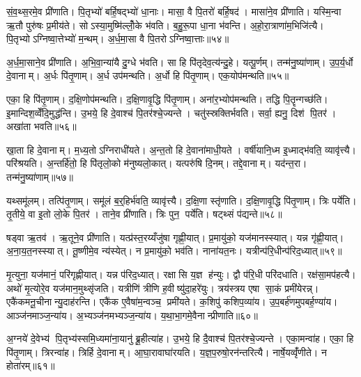 सं॒व॒थ्स॒रमे॒व प्री॑णाति। पि॒तृभ्यो॑ बर्\mbox{}हि॒षद्भ्यो॑ धा॒नाः। मासा॒ वै पि॒तरो॑ बर्\mbox{}हि॒षद॑। मासा॑ने॒व प्री॑णाति। यस्मि॒न्वा ऋ॒तौ पुरु॑षः प्र॒मीय॑ते। सोऽस्या॒मुष्मि॑ल्लोँ॒के भ॑वति। ब॒हु॒रू॒पा धा॒ना भ॑वन्ति। अ॒हो॒रा॒त्राणा॑म॒भिजि॑त्यै। पि॒तृभ्योऽग्निष्वा॒त्तेभ्यो॑ म॒न्थम्। अ॒र्ध॒मा॒सा वै पि॒तरोऽग्निष्वा॒त्ताः॥५४॥

अ॒र्ध॒मा॒साने॒व प्री॑णाति। अ॒भि॒वा॒न्या॑यै दु॒ग्धे भ॑वति। सा हि पि॑तृदेव॒त्य॑न्दु॒हे। यत्पू॒र्णम्। तन्म॑नु॒ष्या॑णाम्। उ॒प॒र्य॒र्धो दे॒वानाम्। अ॒र्धः पि॑तृ॒णाम्। अ॒र्ध उप॑मन्थति। अ॒र्धो हि पि॑तृ॒णाम्। एक॒योप॑मन्थति॥५५॥

एका॒ हि पि॑तृ॒णाम्। द॒क्षि॒णोप॑मन्थति। द॒क्षि॒णावृ॒द्धि पि॑तृ॒णाम्। अना॑र॒भ्योप॑मन्थति। तद्धि पि॒तॄन्गच्छ॑ति। इ॒मान्दिश॒व्वेँदि॒मुद्ध॑न्ति। उ॒भये॒ हि दे॒वाश्च॑ पि॒तर॑श्चे॒ज्यन्ते। चतु॑स्स्रक्तिर्भवति। सर्वा॒ ह्यनु॒ दिश॑ पि॒तर॑। अखा॑ता भवति॥५६॥

खा॒ता हि दे॒वानाम्। म॒ध्य॒तोऽग्निराधी॑यते। अ॒न्त॒तो हि दे॒वाना॑माधी॒यते। वर्\mbox{}षी॑यानि॒ध्म इ॒ध्माद्भ॑वति॒ व्यावृ॑त्त्यै। परि॑श्रयति। अ॒न्तर्\mbox{}हि॑तो॒ हि पि॑तृलो॒को म॑नुष्यलो॒कात्। यत्परु॑षि दि॒नम्। तद्दे॒वानाम्। यद॑न्त॒रा। तन्म॑नु॒ष्या॑णाम्॥५७॥

यथ्समू॑लम्। तत्पि॑तृ॒णाम्। समू॑लं ब॒र्॒हिर्भ॑वति॒ व्यावृ॑त्त्यै। द॒क्षि॒णा स्तृ॑णाति। द॒क्षि॒णावृ॒द्धि पि॑तृ॒णाम्। त्रिः पर्ये॑ति। तृ॒तीये॒ वा इ॒तो लो॒के पि॒तर॑। ताने॒व प्री॑णाति। त्रिः पुन॒ पर्ये॑ति। षट्थ्सं प॑द्यन्ते॥५८॥

षड्वा ऋ॒तव॑। ऋ॒तूने॒व प्री॑णाति। यत्प्र॑स्त॒रय्यँजु॑षा गृह्णी॒यात्। प्र॒मायु॑को॒ यज॑मानस्स्यात्। यन्न गृ॑ह्णी॒यात्। अ॒ना॒य॒त॒नस्स्यात्। तू॒ष्णीमे॒व न्य॑स्येत्। न प्र॒मायु॑को॒ भव॑ति। नाना॑यत॒नः। यत्रीन्प॑रि॒धीन्प॑रिद॒ध्यात्॥५९॥

मृ॒त्युना॒ यज॑मानं॒ परि॑गृह्णीयात्। यन्न प॑रिद॒ध्यात्। रक्षासि य॒ज्ञ ह॑न्युः। द्वौ प॑रि॒धी परि॑दधाति। रक्ष॑सा॒मप॑हत्यै। अथो॑ मृ॒त्योरे॒व यज॑मान॒मुथ्सृ॑जति। यत्रीणि॑ त्रीणि ह॒वीष्यु॑दा॒हरे॑युः। त्रय॑स्त्रय एषा सा॒कं प्रमी॑येरन्न्। एकै॑कमनू॒चीनान्यु॒दाह॑रन्ति। एकै॑क ए॒वैषा॑म॒न्वञ्च॒ प्रमी॑यते। क॒शिपु॑ कशिप॒व्या॑य। उ॒प॒बर्\mbox{}ह॑णमुपबर्\mbox{}ह॒ण्या॑य। आञ्ज॑नमाञ्ज॒न्या॑य। अ॒भ्यञ्ज॑नमभ्यञ्ज॒न्या॑य। य॒था॒भा॒गमे॒वैनान्प्रीणाति॥६०॥

अ॒ग्नये॑ दे॒वेभ्य॑ पि॒तृभ्य॑स्समि॒ध्यमा॑ना॒यानु॑ ब्रू॒हीत्या॑ह। उ॒भये॒ हि दै॒वाश्च॑ पि॒तर॑श्चे॒ज्यन्ते। एका॒मन्वा॑ह। एका॒ हि पि॑तृ॒णाम्। त्रिरन्वा॑ह। त्रिर्\mbox{}हि दे॒वानाम्। आ॒घा॒रावाघा॑रयति। य॒ज्ञ॒प॒रुषो॒रन॑न्तरित्यै। नार्\mbox{}षे॒यव्वृँ॑णीते। न होता॑रम्॥६१॥

